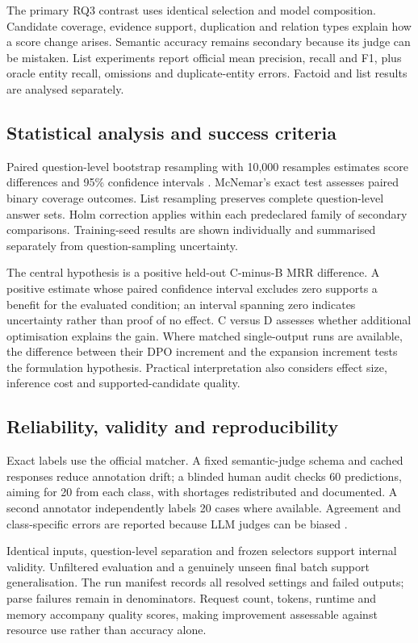 \documentclass[12pt,a4paper]{article}
\begin{document}
The primary RQ3 contrast uses identical selection and model composition. Candidate coverage, evidence support, duplication and relation types explain how a score change arises. Semantic accuracy remains secondary because its judge can be mistaken. List experiments report official mean precision, recall and F1, plus oracle entity recall, omissions and duplicate-entity errors. Factoid and list results are analysed separately.

\subsection{Statistical analysis and success criteria}

Paired question-level bootstrap resampling with 10,000 resamples estimates score differences and 95\% confidence intervals \citep{koehn2004statistical}. McNemar's exact test assesses paired binary coverage outcomes. List resampling preserves complete question-level answer sets. Holm correction applies within each predeclared family of secondary comparisons. Training-seed results are shown individually and summarised separately from question-sampling uncertainty.

The central hypothesis is a positive held-out C-minus-B MRR difference. A positive estimate whose paired confidence interval excludes zero supports a benefit for the evaluated condition; an interval spanning zero indicates uncertainty rather than proof of no effect. C versus D assesses whether additional optimisation explains the gain. Where matched single-output runs are available, the difference between their DPO increment and the expansion increment tests the formulation hypothesis. Practical interpretation also considers effect size, inference cost and supported-candidate quality.

\subsection{Reliability, validity and reproducibility}

Exact labels use the official matcher. A fixed semantic-judge schema and cached responses reduce annotation drift; a blinded human audit checks 60 predictions, aiming for 20 from each class, with shortages redistributed and documented. A second annotator independently labels 20 cases where available. Agreement and class-specific errors are reported because LLM judges can be biased \citep{zheng2023judging,wang2024fair}.

Identical inputs, question-level separation and frozen selectors support internal validity. Unfiltered evaluation and a genuinely unseen final batch support generalisation. The run manifest records all resolved settings and failed outputs; parse failures remain in denominators. Request count, tokens, runtime and memory accompany quality scores, making improvement assessable against resource use rather than accuracy alone.
\end{document}
